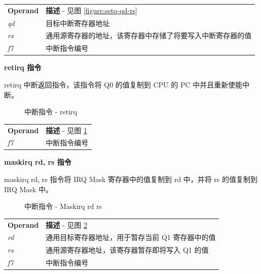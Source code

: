 \documentclass[main\_\_CN.tex]{subfiles}
\begin{document}
\begin{tabular}{ l l }
\textbf{Operand} & \textbf{描述} - 见图 \ref{figure:setq-qd-rs} \\
\textit{qd} & 目标中断寄存器地址 \\
\textit{rs} & 通用源寄存器的地址，该寄存器中存储了将要写入中断寄存器的值 \\
\textit{f7} &  中断指令编号 \\
\end{tabular}

\textcolor{istcolor}{\textbf{retirq 指令}}

retirq 中断返回指令，该指令将 Q0 的值复制到 CPU 的 PC 中并且重新使能中断。

%
%
%
%
%
%
\begin{figure}[H]
    \centering
    \caption{中断指令 - retirq }
    \label{figure:retirq}
\end{figure}

\begin{tabular}{ l l }
\textbf{Operand} & \textbf{描述} - 见图 \ref{figure:retirq} \\
\textit{f7} & 中断指令编号 \\
\end{tabular}

\textcolor{istcolor}{\textbf{maskirq rd, rs 指令}}

maskirq rd, rs 指令将 IRQ Mask 寄存器中的值复制到 rd 中，并将 rs 的值复制到 IRQ Mask 中。

%
%
%
%
%
%
\begin{figure}[H]
    \centering
    \caption{中断指令 - Maskirq rd rs  }
    \label{figure:Maskirq-rd-rs}
\end{figure}

\begin{tabular}{ l l }
\textbf{Operand} & \textbf{描述} - 见图 \ref{figure:Maskirq-rd-rs} \\
\textit{rd} & 通用目标寄存器地址，用于暂存当前 Q1 寄存器中的值 \\
\textit{rs} & 通用源寄存器地址，该寄存器暂存即将写入 Q1 的值 \\
\textit{f7} & 中断指令编号 \\
\end{tabular}
\end{document}
